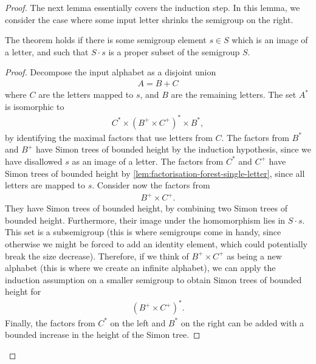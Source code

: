 \begin{proof}
The next lemma essentially covers the induction step. In this lemma, we consider the case where some input letter shrinks the semigroup on the right. 
\begin{lemma}\label{lem:factorisation-forest-shrinking-letter}
    The theorem holds if there is some semigroup element $s \in S$ which is an image of a letter, and such that $S \cdot s$ is a proper subset of the semigroup $S$.
\end{lemma}
\begin{proof} Decompose the input alphabet as a disjoint union 
    \begin{align*}
    A = B + C
    \end{align*}
    where $C$ are the letters  mapped to $s$, and $B$ are the remaining letters.     The set $A^*$ is isomorphic to 
    \begin{align*}
    C^* \times (B^+ \times C^+)^* \times B^*,
    \end{align*}
    by identifying the  maximal factors that use letters from $C$. The factors from $B^*$ and $B^+$ have Simon trees of bounded height by the induction hypothesis, since we have disallowed $s$ as an image of a letter. The factors from $C^*$ and $C^+$ have Simon trees of bounded height by \cref{lem:factorisation-forest-single-letter}, since all letters are mapped to $s$.  Consider now the factors from 
    \begin{align*}
    B^+ \times C^+.
    \end{align*}
    They have Simon trees of bounded height, by combining two  Simon trees of bounded height. Furthermore, their image under the homomorphism lies in $S \cdot s$. This set is a subsemigroup (this is where semigroups come in handy, since otherwise we might be forced to add an identity element, which could potentially break the size decrease). Therefore, if we think of $B^+ \times C^+$ as being a new alphabet (this is where we create an infinite alphabet), we can apply the induction assumption on a smaller semigroup to obtain Simon trees of bounded height for 
    \begin{align*}
    (B^+ \times C^+)^*.
    \end{align*}
Finally, the factors from $C^*$ on the left and $B^*$ on the right can be added with a bounded increase in the height of the Simon tree.
\end{proof}


\end{proof}

